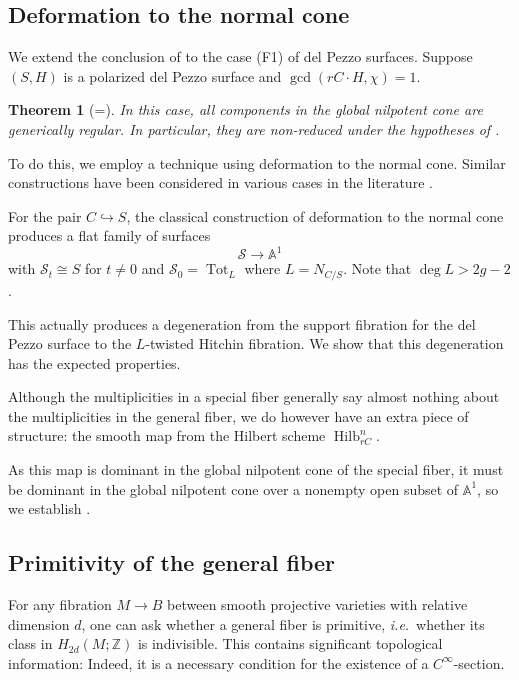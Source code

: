 \documentclass{amsart}
\theoremstyle{plain}
\newtheorem{theorem}{Theorem}[section]
\theoremstyle{definition}
\theoremstyle{remark}
\begin{document}
\subsection{Deformation to the normal cone}
We extend the conclusion of  to the case (F1) of del Pezzo surfaces.
Suppose $(S,H)$ is a polarized del Pezzo surface and $\gcd(rC\cdot H,\chi)=1$.
\begin{theorem}[=]\label{intro:delpezzo}
    In this case, all components in the global nilpotent cone are generically regular.
    In particular, they are non-reduced under the hypotheses of .
\end{theorem}
To do this, we employ a technique using deformation to the normal cone.
Similar constructions have been considered in various cases in the literature \cite{DLL97,dCMS22,zhao2025}.

For the pair $C\hookrightarrow S$, the classical construction of deformation to the normal cone produces a flat family of surfaces
\[\mathcal S\to\mathbb A^1
\]
with $\mathcal S_t\cong S$ for $t\neq 0$ and $\mathcal S_0=\operatorname{Tot}_L$ where $L=N_{C/S}$.
Note that $\deg L>2g-2$.

This actually produces a degeneration from the support fibration for the del Pezzo surface to the $L$-twisted Hitchin fibration.
We show that this degeneration has the expected properties.

Although the multiplicities in a special fiber generally say almost nothing about the multiplicities in the general fiber, we do however have an extra piece of structure: the smooth map from the Hilbert scheme $\operatorname{Hilb}_{rC}^n$.

As this map is dominant in the global nilpotent cone of the special fiber, it must be dominant in the global nilpotent cone over a nonempty open subset of $\mathbb A^1$, so we establish .

\subsection{Primitivity of the general fiber}
For any fibration $M\to B$ between smooth projective varieties with relative dimension $d$, one can ask whether a general fiber is primitive, \emph{i.e.}~whether its class in $H_{2d}(M;\mathbb Z)$ is indivisible.
This contains significant topological information:
Indeed, it is a necessary condition for the existence of a $C^\infty$-section.
\end{document}

